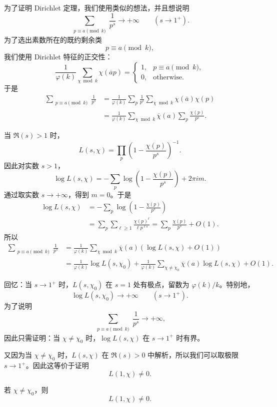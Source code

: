 为了证明 Dirichlet 定理，我们使用类似的想法，并且想说明
\[
	\sum_{\substack{p\equiv a\pmod k}}\frac{1}{p^s}
	\longrightarrow +\infty
	\qquad (s\to 1^+).
\]
为了选出素数所在的既约剩余类
\[
	p\equiv a\pmod k,
\]
我们使用 Dirichlet 特征的正交性：
\[
	\frac{1}{\varphi(k)}
	\sum_{\chi\bmod k}\chi(\overline{a}p)
	=
	\begin{cases}
		1, & p\equiv a\pmod k,\\
		0, & \text{otherwise}.
	\end{cases}
\]
于是
\[
\begin{aligned}
	\sum_{\substack{p\equiv a\pmod k}}\frac{1}{p^s}
	&=
	\frac{1}{\varphi(k)}
	\sum_p\frac{1}{p^s}
	\sum_{\chi\bmod k}\chi(\overline{a})\chi(p)  \\
	&=
	\frac{1}{\varphi(k)}
	\sum_{\chi\bmod k}\overline{\chi}(a)
	\sum_p\frac{\chi(p)}{p^s}.
\end{aligned}
\]

当 $\Re(s)>1$ 时，
\[
	L(s,\chi)=\prod_p\left(1-\frac{\chi(p)}{p^s}\right)^{-1}.
\]
因此对实数 $s>1$，
\[
	\log L(s,\chi)
	=
	-\sum_p\log\left(1-\frac{\chi(p)}{p^s}\right)+2\pi i m.
\]
通过取实数 $s\to+\infty$，得到 $m=0$。于是
\[
\begin{aligned}
	\log L(s,\chi)
	&=
	-\sum_p\log\left(1-\frac{\chi(p)}{p^s}\right)  \\
	&=
	\sum_p\sum_{\ell\geq 1}\frac{\chi(p)^\ell}{\ell p^{\ell s}}
	=
	\sum_p\frac{\chi(p)}{p^s}+O(1).
\end{aligned}
\]
所以
\[
\begin{aligned}
	\sum_{\substack{p\equiv a\pmod k}}\frac{1}{p^s}
	&=
	\frac{1}{\varphi(k)}
	\sum_{\chi\bmod k}\overline{\chi}(a)
	\left(\log L(s,\chi)+O(1)\right)  \\
	&=
	\frac{1}{\varphi(k)}\log L(s,\chi_0)
	+
	\frac{1}{\varphi(k)}
	\sum_{\chi\neq\chi_0}\overline{\chi}(a)\log L(s,\chi)
	+
	O(1).
\end{aligned}
\]

回忆：当 $s\to 1^+$ 时，$L(s,\chi_0)$ 在 $s=1$ 处有极点，留数为 $\varphi(k)/k$。特别地，
\[
	\log L(s,\chi_0)\to+\infty
	\qquad (s\to 1^+).
\]
为了说明
\[
	\sum_{\substack{p\equiv a\pmod k}}\frac{1}{p^s}
	\to+\infty,
\]
因此只需证明：当 $\chi\neq\chi_0$ 时，$\log L(s,\chi)$ 在 $s\to1^+$ 时有界。

又因为当 $\chi\neq\chi_0$ 时，$L(s,\chi)$ 在 $\Re(s)>0$ 中解析，所以我们可以取极限 $s\to1^+$。因此这等价于证明
\[
	L(1,\chi)\neq 0.
\]

\begin{theorem}
	若 $\chi\neq\chi_0$，则
	\[
		L(1,\chi)\neq 0.
	\]
\end{theorem}

